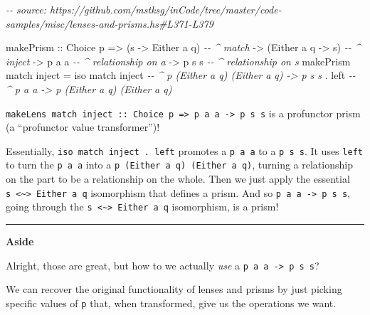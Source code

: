 \documentclass[]{article}
\newenvironment{Shaded}{}{}
\newcommand{\CommentTok}[1]{\textcolor[rgb]{0.38,0.63,0.69}{\textit{#1}}}
\newcommand{\DataTypeTok}[1]{\textcolor[rgb]{0.56,0.13,0.00}{#1}}
\newcommand{\NormalTok}[1]{#1}
\newcommand{\OperatorTok}[1]{\textcolor[rgb]{0.40,0.40,0.40}{#1}}
\newcommand{\OtherTok}[1]{\textcolor[rgb]{0.00,0.44,0.13}{#1}}
\begin{document}
\begin{Shaded}
\begin{Highlighting}[]
\CommentTok{{-}{-} source: https://github.com/mstksg/inCode/tree/master/code{-}samples/misc/lenses{-}and{-}prisms.hs\#L371{-}L379}

\NormalTok{makePrism}
\OtherTok{    ::} \DataTypeTok{Choice}\NormalTok{ p}
    \OtherTok{=>}\NormalTok{ (s }\OtherTok{{-}>} \DataTypeTok{Either}\NormalTok{ a q)    }\CommentTok{{-}{-} \^{} match}
    \OtherTok{{-}>}\NormalTok{ (}\DataTypeTok{Either}\NormalTok{ a q }\OtherTok{{-}>}\NormalTok{ s)    }\CommentTok{{-}{-} \^{} inject}
    \OtherTok{{-}>}\NormalTok{ p a a                }\CommentTok{{-}{-} \^{} relationship on a}
    \OtherTok{{-}>}\NormalTok{ p s s                }\CommentTok{{-}{-} \^{} relationship on s}
\NormalTok{makePrism match inject }\OtherTok{=}
\NormalTok{    iso match inject   }\CommentTok{{-}{-} \^{} p (Either a q) (Either a q) {-}> p s s}
  \OperatorTok{.}\NormalTok{ left\textquotesingle{}              }\CommentTok{{-}{-} \^{} p a a {-}> p (Either a q) (Either a q)}
\end{Highlighting}
\end{Shaded}

\texttt{makeLens\ match\ inject\ ::\ Choice\ p\ =\textgreater{}\ p\ a\ a\ -\textgreater{}\ p\ s\ s}
is a profunctor prism (a ``profunctor value transformer'')!

Essentially, \texttt{iso\ match\ inject\ .\ left\textquotesingle{}} promotes a
\texttt{p\ a\ a} to a \texttt{p\ s\ s}. It uses \texttt{left\textquotesingle{}}
to turn the \texttt{p\ a\ a} into a \texttt{p\ (Either\ a\ q)\ (Either\ a\ q)},
turning a relationship on the part to be a relationship on the whole. Then we
just apply the essential
\texttt{s\ \textless{}\textasciitilde{}\textgreater{}\ Either\ a\ q} isomorphism
that defines a prism. And so \texttt{p\ a\ a\ -\textgreater{}\ p\ s\ s}, going
through the \texttt{s\ \textless{}\textasciitilde{}\textgreater{}\ Either\ a\ q}
isomorphism, is a prism!

\begin{center}\rule{0.5\linewidth}{\linethickness}\end{center}

\textbf{Aside}

Alright, those are great, but how to we actually \emph{use} a
\texttt{p\ a\ a\ -\textgreater{}\ p\ s\ s}?

We can recover the original functionality of lenses and prisms by just picking
specific values of \texttt{p} that, when transformed, give us the operations we
want.
\end{document}
